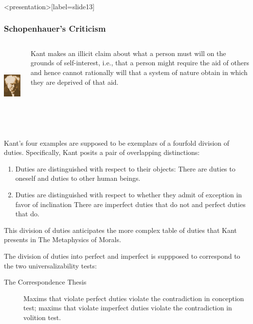 \begin{frame}<presentation>[label=slide13]
    \frametitle{Schopenhauer's Criticism}
        \begin{columns}
            \begin{column}{3cm}
                \includegraphics[height=4cm]{../../graphics/schopenhauer.jpg}
            \end{column}
            \begin{column}{7cm}
                Kant makes an illicit claim about what a person must will on the grounds of self-interest, i.e., that a person might require the aid of others and hence cannot rationally will that a system of nature obtain in which they are deprived of that aid. 
            \end{column}
        \end{columns}
\end{frame}

Kant's four examples are supposed to be exemplars of a fourfold division of duties. Specifically, Kant posits a pair of overlapping distinctions:

\begin{enumerate}
	\item Duties are distinguished with respect to their objects: There are duties to oneself and duties to other human beings.
    \item Duties are distinguished with respect to whether they admit of exception in favor of inclination There are imperfect duties that do not and perfect duties that do.
\end{enumerate}

This division of duties anticipates the more complex table of duties that Kant presents in The Metaphysics of Morals.

The division of duties into perfect and imperfect is suppposed to correspond to the two universalizability tests:

\begin{description}
	\item [ The Correspondence Thesis ] Maxims that violate perfect duties violate the contradiction in conception test; maxims that violate imperfect duties violate the contradiction in volition test.
\end{description}

